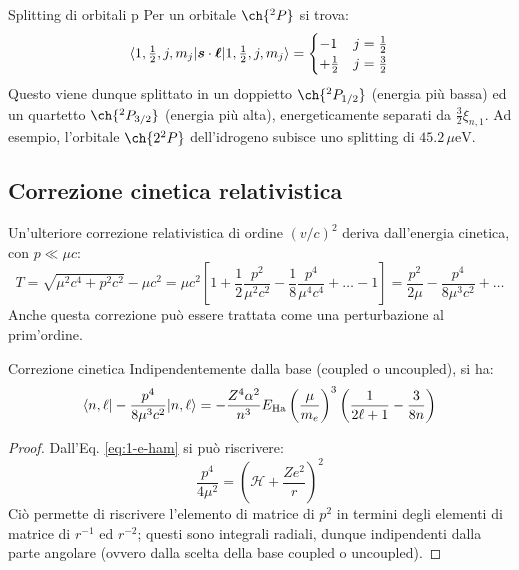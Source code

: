 \begin{example}{Splitting di orbitali p}{}
	Per un orbitale $ \ch{^2 P} $ si trova:
	\begin{equation*}
		\braket{1, \tfrac{1}{2}, j, m_j | \boldsymbol{s} \cdot \boldsymbol{\ell} | 1, \tfrac{1}{2}, j, m_j} =
		\begin{cases}
			-1 & j = \frac{1}{2} \\
			+ \frac{1}{2} & j = \frac{3}{2}
		\end{cases}
	\end{equation*}
	Questo viene dunque splittato in un doppietto $ \ch{^2P_{1/2}} $ (energia più bassa) ed un quartetto $ \ch{^2P_{3/2}} $ (energia più alta), energeticamente separati da $ \frac{3}{2} \xi_{n,1} $. Ad esempio, l'orbitale $ \ch{2 ^2P} $ dell'idrogeno subisce uno splitting di $ 45.2 \,\mu\text{eV} $.
\end{example}

\subsection{Correzione cinetica relativistica}

Un'ulteriore correzione relativistica di ordine $ (v/c)^2 $ deriva dall'energia cinetica, con $ p \ll \mu c $:
\begin{equation*}
	T = \sqrt{\mu^2 c^4 + p^2 c^2} - \mu c^2 = \mu c^2 \left[ 1 + \frac{1}{2} \frac{p^2}{\mu^2 c^2} - \frac{1}{8} \frac{p^4}{\mu^4 c^4} + \dots - 1 \right] = \frac{p^2}{2\mu} - \frac{p^4}{8 \mu^3 c^2} + \dots
\end{equation*}
Anche questa correzione può essere trattata come una perturbazione al prim'ordine.

\begin{proposition}{Correzione cinetica}{}
	Indipendentemente dalla base (coupled o uncoupled), si ha:
	\begin{equation}
		\braket{n,\ell | - \frac{p^4}{8 \mu^3 c^2} | n,\ell} = - \frac{Z^4 \alpha^2}{n^3} E_\text{Ha} \left( \frac{\mu}{m_e} \right)^3 \left( \frac{1}{2\ell + 1} - \frac{3}{8n} \right)
		\label{eq:kin-corr}
	\end{equation}

	\tcblower

	\begin{proof}
		Dall'Eq. \ref{eq:1-e-ham} si può riscrivere:
		\begin{equation*}
			\frac{p^4}{4\mu^2} = \left( \mathcal{H} + \frac{Ze^2}{r} \right)^2
		\end{equation*}
		Ciò permette di riscrivere l'elemento di matrice di $ p^2 $ in termini degli elementi di matrice di $ r^{-1} $ ed $ r^{-2} $; questi sono integrali radiali, dunque indipendenti dalla parte angolare (ovvero dalla scelta della base coupled o uncoupled).
	\end{proof}
\end{proposition}

